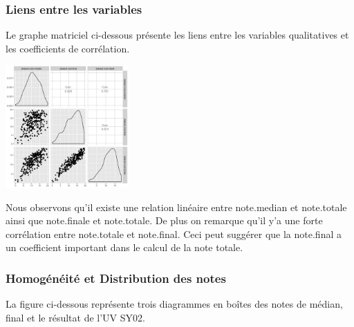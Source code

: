 \documentclass[10pt]{article}
\begin{document}
	\subsubsection{Liens entre les variables}
	Le graphe matriciel ci-dessous présente les liens entre les variables qualitatives et les coefficients de corrélation.
	\begin{center}
		\includegraphics[width=47mm]{Figures/Notes/corr_notes.jpg}
		\label{fig:multiplot_notes}
	\end{center}

	Nous observons qu'il existe une  relation linéaire entre  note.median et note.totale ainsi que note.finale et note.totale. De plus on remarque qu'il y'a une forte corrélation entre note.totale et note.final. Ceci peut suggérer que la note.final a un coefficient important dans le calcul de la note totale.

	\subsubsection{Homogénéité et Distribution des notes}
	La figure ci-dessous représente trois diagrammes en boîtes des notes de médian, final et le résultat de l'UV SY02. 
	
\end{document}

